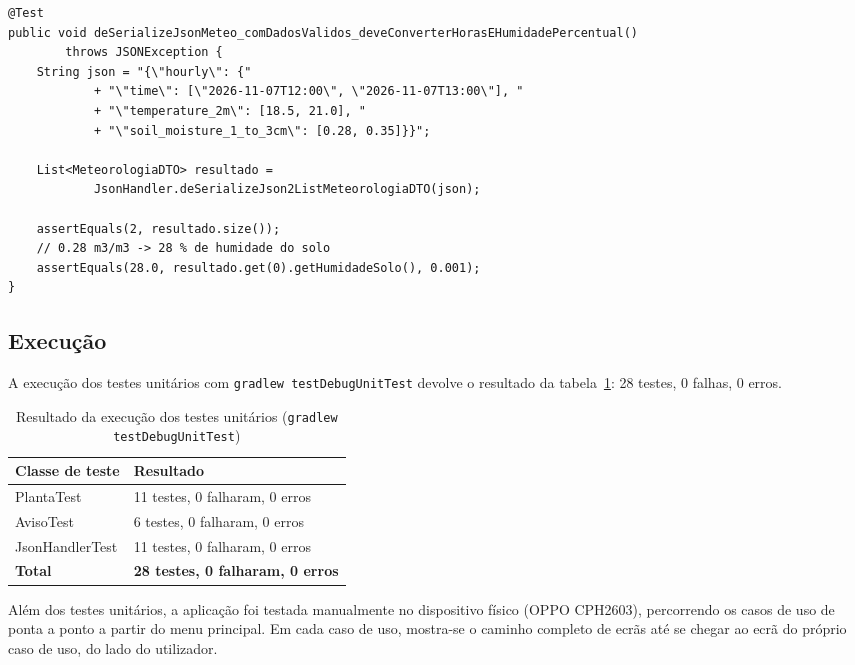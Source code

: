 \documentclass[runningheads,a4paper]{llncs}
\begin{document}
\begin{lstlisting}[caption={JsonHandlerTest -- conversao da humidade do solo},label=lst:jsonhtest, xleftmargin=-2cm, xrightmargin=-2cm]
@Test
public void deSerializeJsonMeteo_comDadosValidos_deveConverterHorasEHumidadePercentual()
        throws JSONException {
    String json = "{\"hourly\": {"
            + "\"time\": [\"2026-11-07T12:00\", \"2026-11-07T13:00\"], "
            + "\"temperature_2m\": [18.5, 21.0], "
            + "\"soil_moisture_1_to_3cm\": [0.28, 0.35]}}";

    List<MeteorologiaDTO> resultado =
            JsonHandler.deSerializeJson2ListMeteorologiaDTO(json);

    assertEquals(2, resultado.size());
    // 0.28 m3/m3 -> 28 % de humidade do solo
    assertEquals(28.0, resultado.get(0).getHumidadeSolo(), 0.001);
}
\end{lstlisting}

\subsection{Execução}

A execução dos testes unitários com \texttt{gradlew testDebugUnitTest}
devolve o resultado da tabela~\ref{tab:testes}: 28 testes, 0 falhas,
0 erros.

\begin{table}[H]
    \centering
    \footnotesize
    \begin{tabularx}{\textwidth}{|l|X|}
        \hline
        \textbf{Classe de teste} & \textbf{Resultado} \\ \hline
        PlantaTest & 11 testes, 0 falharam, 0 erros \\ \hline
        AvisoTest & 6 testes, 0 falharam, 0 erros \\ \hline
        JsonHandlerTest & 11 testes, 0 falharam, 0 erros \\ \hline
        \textbf{Total} & \textbf{28 testes, 0 falharam, 0 erros} \\ \hline
    \end{tabularx}
    \caption{Resultado da execução dos testes unitários
             (\texttt{gradlew testDebugUnitTest})}
    \label{tab:testes}
\end{table}

Além dos testes unitários, a aplicação foi testada manualmente no dispositivo
físico (OPPO CPH2603), percorrendo os casos de uso de ponta a ponto a partir
do menu principal. Em cada caso de uso, mostra-se o caminho completo de ecrãs
até se chegar ao ecrã do próprio caso de uso, do lado do utilizador.
\end{document}
